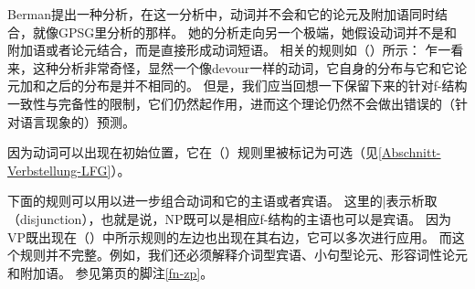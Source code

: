 \ea
\label{le-verschlingen}
\z

\noindent
Berman提出一种分析，在这一分析中，动词并不会和它的论元及附加语同时结合，就像GPSG\indexgpsgc 里分析的那样。
她的分析走向另一个极端，她假设动词并不是和附加语或者论元结合，而是直接形成动词短语。
相关的规则如（）所示：
\ea
\label{LFG-v-vp}
\z
乍一看来，这种分析非常奇怪，显然一个像devour一样的动词，它自身的分布与它和它论元加和之后的分布是并不相同的。
但是，我们应当回想一下保留下来的针对f-结构一致性与完备性的限制，它们仍然起作用，进而这个理论仍然不会做出错误的（针对语言现象的）预测。

因为动词可以出现在初始位置，它在（）规则里被标记为可选（见\ref{Abschnitt-Verbstellung-LFG}）。

下面的规则可以用以进一步组合动词和它的主语或者宾语。
\ea
\label{lfg-vp-regel}
\z
这里的|\isc{$\vert$}\is{$\vert$}表示析取（disjunction），也就是说，NP既可以是相应f-结构的主语也可以是宾语。
因为VP既出现在（）中所示规则的左边也出现在其右边，它可以多次进行应用。
而这个规则并不完整。例如，我们还必须解释介词型宾语、小句型论元、形容词性论元和附加语。
参见第\pageref{fn-zp}页的脚注\ref{fn-zp}。

